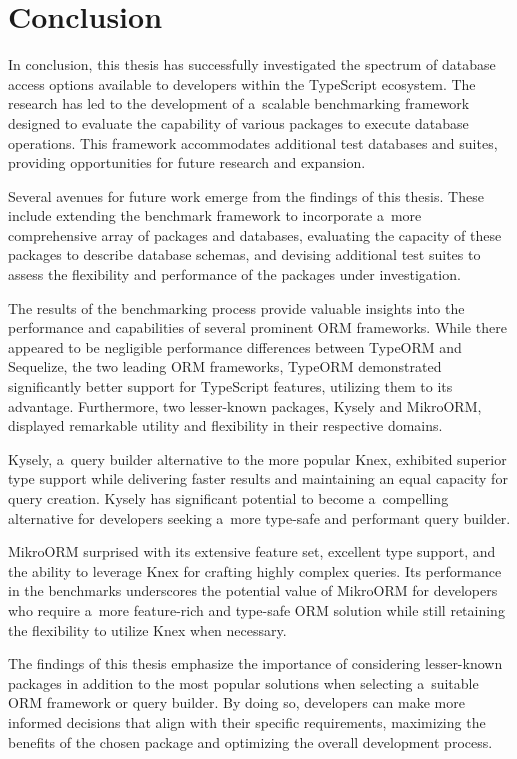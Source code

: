 \chapter{Conclusion}

In conclusion, this thesis has successfully investigated the spectrum of
database access options available to developers within the TypeScript ecosystem.
The research has led to the development of a~scalable benchmarking framework
designed to evaluate the capability of various packages to execute database
operations. This framework accommodates additional test databases and suites,
providing opportunities for future research and expansion.

Several avenues for future work emerge from the findings of this thesis. These
include extending the benchmark framework to incorporate a~more comprehensive
array of packages and databases, evaluating the capacity of these packages to
describe database schemas, and devising additional test suites to assess the
flexibility and performance of the packages under investigation.

The results of the benchmarking process provide valuable insights into the
performance and capabilities of several prominent ORM frameworks. While there
appeared to be negligible performance differences between TypeORM and Sequelize,
the two leading ORM frameworks, TypeORM demonstrated significantly better
support for TypeScript features, utilizing them to its advantage. Furthermore,
two lesser-known packages, Kysely and MikroORM, displayed remarkable utility and
flexibility in their respective domains.

Kysely, a~query builder alternative to the more popular Knex, exhibited superior
type support while delivering faster results and maintaining an equal capacity
for query creation. Kysely has significant potential to become a~compelling
alternative for developers seeking a~more type-safe and performant query
builder.

MikroORM surprised with its extensive feature set, excellent type support, and
the ability to leverage Knex for crafting highly complex queries. Its
performance in the benchmarks underscores the potential value of MikroORM for
developers who require a~more feature-rich and type-safe ORM solution while
still retaining the flexibility to utilize Knex when necessary.

The findings of this thesis emphasize the importance of considering lesser-known
packages in addition to the most popular solutions when selecting a~suitable ORM
framework or query builder. By doing so, developers can make more informed
decisions that align with their specific requirements, maximizing the benefits
of the chosen package and optimizing the overall development process.

